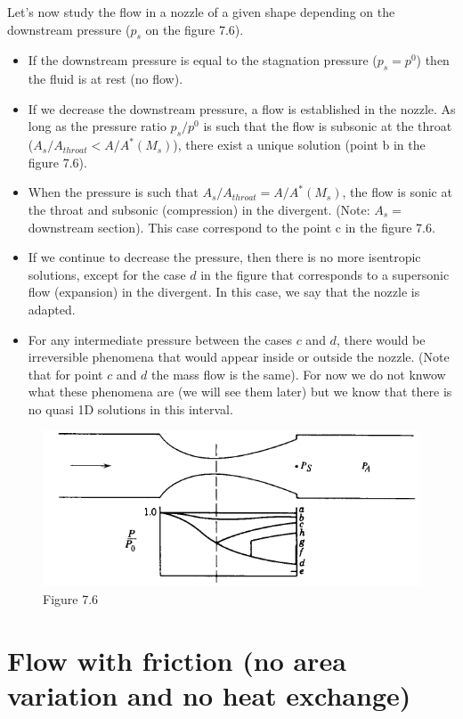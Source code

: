 Let's now study the flow in a nozzle of a given shape depending on the downstream pressure ($p_s$ on the figure 7.6). 

\begin{itemize}
\item If the downstream pressure is equal to the stagnation pressure ($p_s=p^0$) then the fluid is at rest (no flow).
\item If we decrease the downstream pressure, a flow is established in the nozzle. As long as the pressure ratio $p_s/p^0$ is such that the flow is subsonic at the throat ($A_s/A_{throat} < A/A^*(M_s)$), there exist a unique solution (point b in the figure 7.6).
\item When the pressure is such that $A_s/A_{throat}=A/A^*(M_s)$, the flow is sonic at the throat and subsonic (compression) in the divergent. (Note: $A_s=$downstream section). This case correspond to the point c in the figure 7.6.
\item If we continue to decrease the pressure, then there is no more isentropic solutions, except for the case $d$ in the figure that corresponds to a supersonic flow (expansion) in the divergent. In this case, we say that the nozzle is adapted.
\item For any intermediate pressure between the cases $c$ and $d$, there would be irreversible phenomena that would appear inside or outside the nozzle. (Note that for point $c$ and $d$ the mass flow is the same). For now we do not knwow what these phenomena are (we will see them later) but we know that there is no quasi 1D solutions in this interval.
\end{itemize}

\begin{figure}[H]
\begin{center}
\includegraphics[scale=0.55]{ch7/chap76.png}
\caption*{Figure 7.6}
\end{center}
\end{figure}

\section{Flow with friction (no area variation and no heat exchange)}

